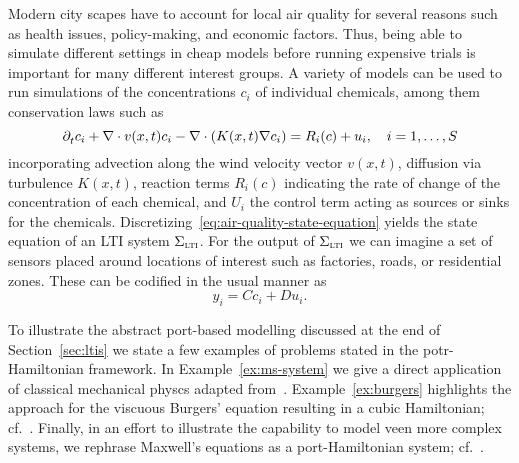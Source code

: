 \begin{example}
    Modern city scapes have to account for local air quality for several reasons such as health issues, policy-making, and economic factors.
    Thus, being able to simulate different settings in cheap models before running expensive trials is important for many different interest groups.
    A variety of models can be used to run simulations of the concentrations $c_i$ of individual chemicals, among them conservation laws such as
    \begin{equation}\label{eq:air-quality-state-equation}
        \pd[t]{} c_i + \nabla \cdot v(x, t) c_i - \nabla \cdot (K(x, t) \nabla c_i) = R_i(c) + u_i,\quad i = 1, \dots, S
    \end{equation}
    incorporating advection along the wind velocity vector $v(x, t)$, diffusion via turbulence $K(x, t)$, reaction terms $R_i(c)$ indicating the rate of change of the concentration of each chemical, and $U_i$ the control term acting as sources or sinks for the chemicals.
    Discretizing~\eqref{eq:air-quality-state-equation} yields the state equation of an LTI system $\Sigma_{\msc{lti}}$.
    For the output of $\Sigma_{\msc{lti}}$ we can imagine a set of sensors placed around locations of interest such as factories, roads, or residential zones.
    These can be codified in the usual manner as
    \begin{equation*}
        y_i = C c_i + D u_i.
    \end{equation*}

\end{example}

To illustrate the abstract port-based modelling discussed at the end of Section~\ref{sec:ltis} we state a few examples of problems stated in the potr-Hamiltonian framework.
In Example~\ref{ex:ms-system} we give a direct application of classical mechanical physcs adapted from~\cite[Example~2.1]{VanDerSchaft2014}.
Example~\ref{ex:burgers} highlights the approach for the viscuous Burgers' equation resulting in a cubic Hamiltonian; cf.~\cite[Example~2.1]{Maschke2005}.
Finally, in an effort to illustrate the capability to model veen more complex systems, we rephrase Maxwell's equations as a port-Hamiltonian system; cf.~\cite[Section~2]{Haine2022}.



